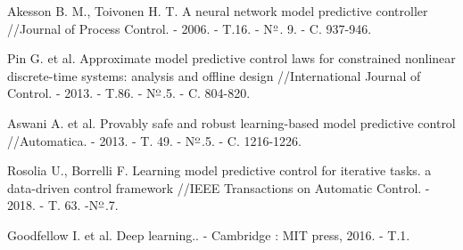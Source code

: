 \begin{biblio}
Akesson B. M., Toivonen H. T. A neural network model predictive controller //Journal of Process Control. - 2006. - T.16. - N$\textsuperscript{\underline{o}}$. 9. - C. 937-946.

Pin G. et al. Approximate model predictive control laws for constrained nonlinear discrete-time systems: analysis and offline design //International Journal of Control. - 2013. - T.86. - N$\textsuperscript{\underline{o}}$.5. - C. 804-820.

Aswani A. et al. Provably safe and robust learning-based model predictive control //Automatica. - 2013. - T. 49. - N$\textsuperscript{\underline{o}}$.5. - C. 1216-1226.

Rosolia U., Borrelli F. Learning model predictive control for iterative tasks. a data-driven control framework //IEEE Transactions on Automatic Control. - 2018. - T. 63. -N$\textsuperscript{\underline{o}}$.7.

Goodfellow I. et al. Deep learning.. - Cambridge : MIT press, 2016. - T.1.

\end{biblio} 
